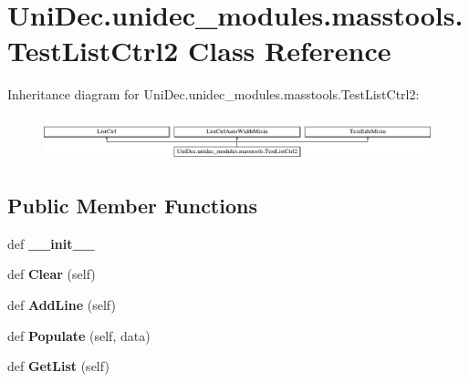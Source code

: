\hypertarget{class_uni_dec_1_1unidec__modules_1_1masstools_1_1_test_list_ctrl2}{}\section{Uni\+Dec.\+unidec\+\_\+modules.\+masstools.\+Test\+List\+Ctrl2 Class Reference}
\label{class_uni_dec_1_1unidec__modules_1_1masstools_1_1_test_list_ctrl2}
Inheritance diagram for Uni\+Dec.\+unidec\+\_\+modules.\+masstools.\+Test\+List\+Ctrl2\+:\begin{figure}[H]
\begin{center}
\leavevmode
\includegraphics[height=1.300813cm]{class_uni_dec_1_1unidec__modules_1_1masstools_1_1_test_list_ctrl2}
\end{center}
\end{figure}
\subsection*{Public Member Functions}
\begin{DoxyCompactItemize}
\item 
\hypertarget{class_uni_dec_1_1unidec__modules_1_1masstools_1_1_test_list_ctrl2_a6dbd66b2b08ffbe8030e58d87c7e5121}{}def {\bfseries \+\_\+\+\_\+init\+\_\+\+\_\+}\label{class_uni_dec_1_1unidec__modules_1_1masstools_1_1_test_list_ctrl2_a6dbd66b2b08ffbe8030e58d87c7e5121}

\item 
\hypertarget{class_uni_dec_1_1unidec__modules_1_1masstools_1_1_test_list_ctrl2_aa7042015a56254878ccf7a5aee40ab8c}{}def {\bfseries Clear} (self)\label{class_uni_dec_1_1unidec__modules_1_1masstools_1_1_test_list_ctrl2_aa7042015a56254878ccf7a5aee40ab8c}

\item 
\hypertarget{class_uni_dec_1_1unidec__modules_1_1masstools_1_1_test_list_ctrl2_a73b4edf6a19a56df49937146d9cfdab1}{}def {\bfseries Add\+Line} (self)\label{class_uni_dec_1_1unidec__modules_1_1masstools_1_1_test_list_ctrl2_a73b4edf6a19a56df49937146d9cfdab1}

\item 
\hypertarget{class_uni_dec_1_1unidec__modules_1_1masstools_1_1_test_list_ctrl2_a12630115376580691b12be5b08514d91}{}def {\bfseries Populate} (self, data)\label{class_uni_dec_1_1unidec__modules_1_1masstools_1_1_test_list_ctrl2_a12630115376580691b12be5b08514d91}

\item 
\hypertarget{class_uni_dec_1_1unidec__modules_1_1masstools_1_1_test_list_ctrl2_ac2d542b98b81bd452ec6bb0431d4ae75}{}def {\bfseries Get\+List} (self)\label{class_uni_dec_1_1unidec__modules_1_1masstools_1_1_test_list_ctrl2_ac2d542b98b81bd452ec6bb0431d4ae75}

\end{DoxyCompactItemize}

